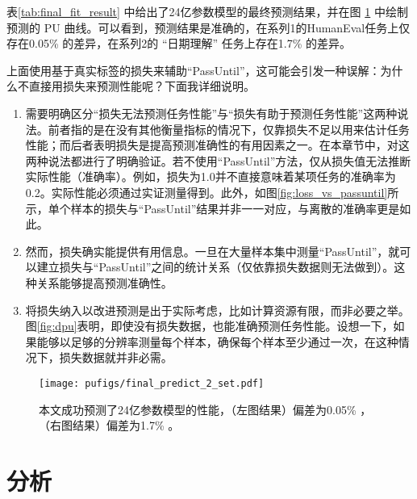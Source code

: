 表\ref{tab:final_fit_result} 中给出了24亿参数模型的最终预测结果，并在图 \ref{fig:final_curve_humaneval_series1} 中绘制预测的 \textsc{PU} 曲线。可以看到，预测结果是准确的，在系列1的HumanEval任务上仅存在0.05\% 的差异，在系列2的 “日期理解” 任务上存在1.7\% 的差异。 


上面使用基于真实标签的损失来辅助“PassUntil”，这可能会引发一种误解：为什么不直接用损失来预测性能呢？下面我详细说明。
\begin{enumerate}
    \item {需要明确区分“损失无法预测任务性能”与“损失有助于预测任务性能”这两种说法。前者指的是在没有其他衡量指标的情况下，仅靠损失不足以用来估计任务性能；而后者表明损失是提高预测准确性的有用因素之一。在本章节中，对这两种说法都进行了明确验证。若不使用“PassUntil”方法，仅从损失值无法推断实际性能（准确率）。例如，损失为1.0并不直接意味着某项任务的准确率为0.2。实际性能必须通过实证测量得到。此外，如图\ref{fig:loss_vs_passuntil}所示，单个样本的损失与“PassUntil”结果并非一一对应，与离散的准确率更是如此。}
    \item {然而，损失确实能提供有用信息。一旦在大量样本集中测量“PassUntil”，就可以建立损失与“PassUntil”之间的统计关系（仅依靠损失数据则无法做到）。这种关系能够提高预测准确性。}
    \item {将损失纳入以改进预测是出于实际考虑，比如计算资源有限，而非必要之举。图\ref{fig:dpu}表明，即使没有损失数据，也能准确预测任务性能。设想一下，如果能够以足够的分辨率测量每个样本，确保每个样本至少通过一次，在这种情况下，损失数据就并非必需。}
\end{enumerate}


\begin{figure}[!htbp]
    \centering
    \texttt{[image: pufigs/final\_predict\_2\_set.pdf]}
    \caption{本文成功预测了24亿参数模型的性能，（左图结果）偏差为0.05\% ，（右图结果）偏差为1.7\% 。 }
    \label{fig:final_curve_humaneval_series1} 
\end{figure}


\section{分析}
\label{sec:emergent}


